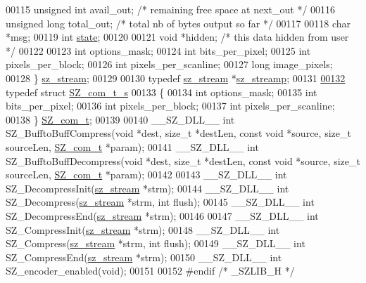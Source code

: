 \begin{DoxyCode}
00115     \textcolor{keywordtype}{unsigned} \textcolor{keywordtype}{int}    avail\_out; \textcolor{comment}{/* remaining free space at next\_out */}
00116     \textcolor{keywordtype}{unsigned} \textcolor{keywordtype}{long}    total\_out; \textcolor{comment}{/* total nb of bytes output so far */}
00117 
00118     \textcolor{keywordtype}{char}            *msg;
00119     \textcolor{keywordtype}{int}                \hyperlink{structstate}{state};
00120 
00121     \textcolor{keywordtype}{void}            *hidden;    \textcolor{comment}{/* this data hidden from user */}
00122 
00123     \textcolor{keywordtype}{int}        options\_mask;
00124     \textcolor{keywordtype}{int}        bits\_per\_pixel;
00125     \textcolor{keywordtype}{int}        pixels\_per\_block;
00126     \textcolor{keywordtype}{int}        pixels\_per\_scanline;
00127     \textcolor{keywordtype}{long}    image\_pixels;
00128     \} \hyperlink{structsz__stream__s}{sz\_stream};
00129 
00130 \textcolor{keyword}{typedef} \hyperlink{structsz__stream__s}{sz\_stream} *\hyperlink{structsz__stream__s}{sz\_streamp};
00131 
\hyperlink{struct_s_z__com__t__s}{00132} \textcolor{keyword}{typedef} \textcolor{keyword}{struct }\hyperlink{struct_s_z__com__t__s}{SZ\_com\_t\_s}
00133     \{
00134     \textcolor{keywordtype}{int} options\_mask;
00135     \textcolor{keywordtype}{int} bits\_per\_pixel;
00136     \textcolor{keywordtype}{int} pixels\_per\_block;
00137     \textcolor{keywordtype}{int} pixels\_per\_scanline;
00138     \} \hyperlink{struct_s_z__com__t__s}{SZ\_com\_t};
00139 
00140 \_\_SZ\_DLL\_\_ \textcolor{keywordtype}{int} SZ\_BufftoBuffCompress(\textcolor{keywordtype}{void} *dest, \textcolor{keywordtype}{size\_t} *destLen, \textcolor{keyword}{const} \textcolor{keywordtype}{void} *source, \textcolor{keywordtype}{size\_t} sourceLen, 
      \hyperlink{struct_s_z__com__t__s}{SZ\_com\_t} *param);
00141 \_\_SZ\_DLL\_\_ \textcolor{keywordtype}{int} SZ\_BufftoBuffDecompress(\textcolor{keywordtype}{void} *dest, \textcolor{keywordtype}{size\_t} *destLen, \textcolor{keyword}{const} \textcolor{keywordtype}{void} *source, \textcolor{keywordtype}{size\_t} sourceLen, 
      \hyperlink{struct_s_z__com__t__s}{SZ\_com\_t} *param);
00142 
00143 \_\_SZ\_DLL\_\_ \textcolor{keywordtype}{int} SZ\_DecompressInit(\hyperlink{structsz__stream__s}{sz\_stream} *strm);
00144 \_\_SZ\_DLL\_\_ \textcolor{keywordtype}{int} SZ\_Decompress(\hyperlink{structsz__stream__s}{sz\_stream} *strm, \textcolor{keywordtype}{int} flush);
00145 \_\_SZ\_DLL\_\_ \textcolor{keywordtype}{int} SZ\_DecompressEnd(\hyperlink{structsz__stream__s}{sz\_stream} *strm);
00146 
00147 \_\_SZ\_DLL\_\_ \textcolor{keywordtype}{int} SZ\_CompressInit(\hyperlink{structsz__stream__s}{sz\_stream} *strm);
00148 \_\_SZ\_DLL\_\_ \textcolor{keywordtype}{int} SZ\_Compress(\hyperlink{structsz__stream__s}{sz\_stream} *strm, \textcolor{keywordtype}{int} flush);
00149 \_\_SZ\_DLL\_\_ \textcolor{keywordtype}{int} SZ\_CompressEnd(\hyperlink{structsz__stream__s}{sz\_stream} *strm);
00150 \_\_SZ\_DLL\_\_ \textcolor{keywordtype}{int} SZ\_encoder\_enabled(\textcolor{keywordtype}{void});
00151 
00152 \textcolor{preprocessor}{#endif }\textcolor{comment}{/* \_SZLIB\_H */}\textcolor{preprocessor}{}
\end{DoxyCode}
